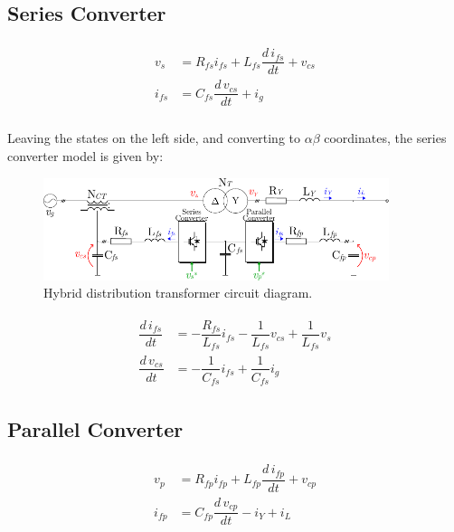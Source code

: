 \subsection{Series Converter}

\begin{align}
    \begin{aligned}
        v_s &= R_{fs}i_{fs} + L_{fs}\dfrac{d\,i_{fs}}{dt} + v_{cs} \\
        i_{fs} &= C_{fs}\dfrac{d\,v_{cs}}{dt} + i_g \\
    \end{aligned}
\end{align}

Leaving the states on the left side, and converting to $\alpha\beta$ coordinates, the series converter model is given by:

\begin{figure}
    \centering
    \includegraphics[width=0.9\textwidth]{Images/HDT_Diagram.pdf} 
    \caption{Hybrid distribution transformer circuit diagram.}
    \label{fig:HDT_Transformer}
\end{figure}

\begin{align}
    \begin{aligned}
        \dfrac{d\,i_{fs}}{dt} &= -\dfrac{R_{fs}}{L_{fs}}i_{fs} - \dfrac{1}{L_{fs}}v_{cs} + \dfrac{1}{L_{fs}}v_s \\
        \dfrac{d\,v_{cs}}{dt} &= -\dfrac{1}{C_{fs}}i_{fs} + \dfrac{1}{C_{fs}}i_g
    \end{aligned}
\end{align}

\subsection{Parallel Converter}

\begin{align}
    \begin{aligned}
        v_p &= R_{fp}i_{fp} + L_{fp}\dfrac{d\,i_{fp}}{dt} + v_{cp} \\
        i_{fp} &= C_{fp}\dfrac{d\,v_{cp}}{dt} - i_Y + i_L
    \end{aligned}
\end{align}

